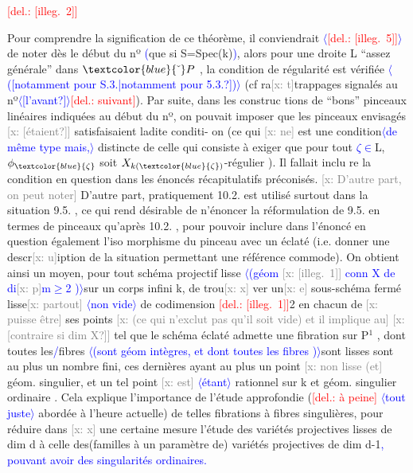 \documentclass[11pt]{article}
\newcommand{\scanpage}[1]{\par\bigskip\noindent{\small\sffamily[scan #1]}\par}
\newcommand{\mspage}[1]{{\small\sffamily[p.\,#1]}}
\newcommand{\hand}[1]{\textcolor{blue}{#1}}
\newcommand{\inserted}[2][]{\textcolor{blue}{$\langle$#2$\rangle$}}
\newcommand{\deleted}[1]{\textcolor{red}{[\textsf{del.:} #1]}}
\newcommand{\xout}[1]{\textcolor{gray}{[\textsf{x:} #1]}}
\newcommand{\unsure}[1]{[#1?]}
\newcommand{\illegible}[1]{[\textsf{illeg.\ #1}]}
\begin{document}
\mspage{59}

\clearpage
\scanpage{25/60}
\deleted{\illegible{2}} \mspage{55}

Pour comprendre la signification de ce théorème, il conviendrait
\inserted{\deleted{\illegible{5}}}
de noter dès le début du nº \hand{(}que  si S=Spec(k)\hand{)}, alors pour une droite
L ``assez générale'' dans $\hand{\check{\ }}P$ ,  la condition de régularité est vérifiée \inserted{(\unsure{notamment pour S.3.|notamment pour 5.3.})}
(cf ra\xout{t}trappages signalés au  nº\inserted{\unsure{l'avant}}\deleted{suivant}).  Par suite, dans les construc%
tions de ``bons'' pinceaux linéaires  indiquées au début du nº, on pouvait
imposer que les pinceaux envisagés \xout{\unsure{étaient}} satisfaisaient ladite conditi-
on  (ce qui \xout{ne} est une condition\inserted[typed]{de même type mais\hand{,}} distincte de celle qui consiste à
exiger que pour tout \hand{$\zeta\in$}L,  $\phi_{\hand{\zeta}}$  soit $X_{k(\hand{\zeta})}$-régulier ). Il fallait inclu
re la condition en question dans les énoncés récapitulatifs préconisés.
\xout{D'autre part, on peut noter}  D'autre part, pratiquement  10.2. est
utilisé surtout dans la situation 9.5. ,  ce qui  rend  désirable de
n'énoncer la réformulation de  9.5.  en termes de pinceaux qu'après
10.2. , pour pouvoir  inclure dans l'énoncé en question  également l'iso
morphisme du pinceau avec un éclaté (i.e. donner une descr\xout{u}iption de la
situation  permettant une référence commode).  On obtient ainsi un
moyen, pour tout schéma projectif lisse \inserted[typed]{\hand{(}géom \xout{\illegible{1}} conn  X  de di\xout{p}m$\geq$2 \hand{)}}sur un corps infini k,  de trou\xout{x}
ver un\xout{e} sous-schéma fermé lisse\xout{ partout} \inserted[typed]{non vide} de codimension \deleted{\illegible{1}}2 en chacun de
\xout{puisse être}
ses points \xout{(ce qui n'exclut pas qu'il soit vide) et il implique au}
\xout{\unsure{contraire si dim X}} tel que le schéma éclaté admette une fibration
sur P$^1$ , dont toutes les\hand{/}fibres \inserted[typed]{\hand{(}sont géom intègres, et  dont toutes les fibres \hand{)}}sont lisses sont au plus un nombre fini,
ces dernières ayant au plus un point \xout{non lisse (et} géom. singulier, et
un tel point \xout{est} \inserted[typed]{étant} rationnel sur k et géom. singulier ordinaire .  Cela
explique l'importance  de l'étude approfondie (\deleted{à peine} \inserted{tout juste} abordée à l'heure
actuelle) de telles fibrations à fibres singulières, pour réduire dans \xout{x}
une certaine mesure l'étude des variétés projectives lisses de dim d
à celle des(familles à un paramètre de) variétés projectives de dim d-1\hand{,}
\hand{pouvant avoir des singularités ordinaires.}
\end{document}
